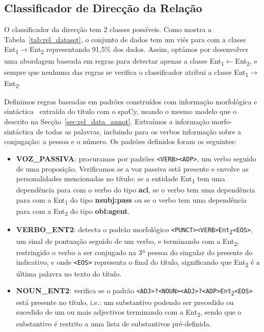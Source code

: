 \documentclass[a4paper, twocolumn, 11pt, twoside]{article}
\begin{document}
\subsection{Classificador de Direcção da Relação}
\label{subsec:rel_direction}

O classificador da direcção tem 2 classes possíveis. Como mostra a Tabela~\ref{tab:rel_dataset}, o conjunto de dados tem um viés para com a classe Ent\textsubscript{1}$\rightarrow$Ent\textsubscript{2} representando 91,5\% dos dados. Assim, optámos por desenvolver uma abordagem baseada em regras para detectar apenas a classe Ent\textsubscript{1}$\leftarrow$Ent\textsubscript{2}, e sempre que nenhuma das regras se verifica o classificador atribui a classe Ent\textsubscript{1}$\rightarrow$Ent\textsubscript{2}.

Definimos regras baseadas em padrões construídos com informação morfológica e sintáctica~\citep{nivre-etal-2020-universal} extraída do título com o spaCy, usando o mesmo modelo que o descrito na Secção~\ref{sec:rel_data_annot}. Extraímos a informação morfo-sintáctica de todas as palavras, incluindo para os verbos informação sobre a conjugação: a pessoa e o número. Os padrões definidos foram os seguintes:

\begin{itemize}

\item \textbf{VOZ\_PASSIVA}: procuramos por padrões \texttt{<VERB><ADP>}, um verbo seguido de uma proposição. Verificamos se a voz passiva está presente e envolve as personalidades mencionadas no título: se a entidade Ent\textsubscript{1} tem uma dependência para com o verbo do tipo \textbf{acl}, se o verbo tem uma dependência para com a Ent\textsubscript{1} do tipo \textbf{nsubj:pass} ou se o verbo tem uma dependência para com a Ent\textsubscript{2} do tipo \textbf{obl:agent}. 

\item \textbf{VERBO\_ENT2}: detecta o padrão morfológico \texttt{<PUNCT><VERB>Ent\textsubscript{2}<EOS>}, um sinal de pontuação seguido de um verbo, e terminando com a Ent\textsubscript{2}, restringido o verbo a ser conjugado na 3ª pessoa do singular do presente do indicativo, e onde \texttt{<EOS>} representa o final do título, significando que Ent\textsubscript{2} é a última palavra no texto do título.

\item \textbf{NOUN\_ENT2}: verifica se o padrão \texttt{<ADJ>?<NOUN><ADJ>?<ADP>Ent\textsubscript{2}<EOS>} está presente no título, i.e.: um substantivo podendo ser precedido ou sucedido de um ou mais adjectivos terminando com a Ent\textsubscript{2}, sendo que o substantivo é restrito a uma lista de substantivos pré-definida.
\end{itemize}
\end{document}
